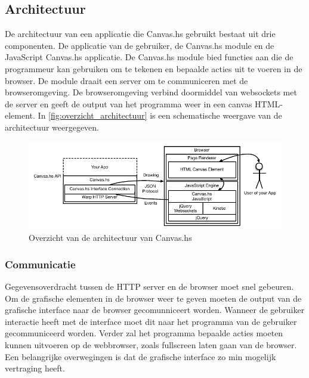 \subsection{Architectuur}
De architectuur van een applicatie die Canvas.hs gebruikt bestaat uit drie componenten. De applicatie van de gebruiker, de Canvas.hs module en de JavaScript Canvas.hs applicatie. De Canvas.hs module bied functies aan die de programmeur kan gebruiken om te tekenen en bepaalde acties uit te voeren in de browser. De module draait een server om te communiceren met de browseromgeving. De browseromgeving verbind doormiddel van websockets met de server en geeft de output van het programma weer in een canvas HTML-element. In \autoref{fig:overzicht_architectuur} is een schematische weergave van de architectuur weergegeven.

\begin{figure}
\begin{center}
\includegraphics[keepaspectratio,width=\textwidth]{./images/architectuur_overzicht.pdf}
\caption{Overzicht van de architectuur van Canvas.hs}
\label{fig:overzicht_architectuur}
\end{center}
\end{figure}

\subsubsection{Communicatie}
Gegevensoverdracht tussen de HTTP server en de browser moet snel gebeuren. Om de grafische elementen in de browser weer te geven moeten de output van de grafische interface naar de browser gecomunniceert worden. Wanneer de gebruiker interactie heeft met de interface moet dit naar het programma van de gebruiker gecommuniceerd worden. Verder zal het programma bepaalde acties moeten kunnen uitvoeren op de webbrowser, zoals fullscreen laten gaan van de browser. Een belangrijke overwegingen is dat de grafische interface zo min mogelijk vertraging heeft.


